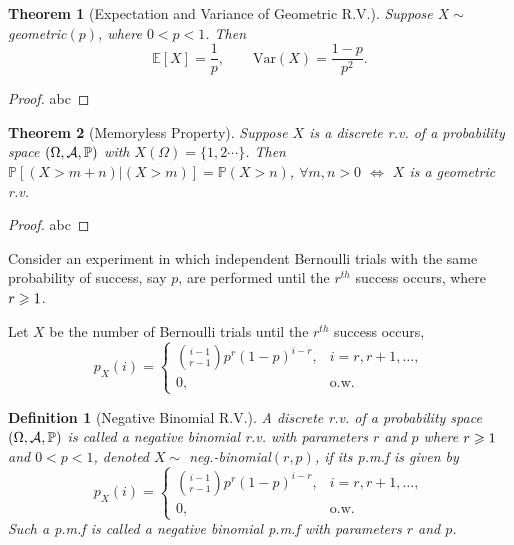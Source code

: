 \documentclass[openany,12pt]{book}
\newtheorem{theorem}{Theorem}[chapter]
\newtheorem{definition}{Definition}[chapter]
\begin{document}
\begin{theorem}[Expectation and Variance of Geometric R.V.]
  Suppose $X\sim$ geometric$(p)$, where $0<p<1$.
  Then
  $$
    \mathbb{E}[X]=\frac{1}{p},\qquad
    \mathrm{Var}(X)=\frac{1-p}{p^2}.
  $$
\end{theorem}

\begin{proof}
  abc
\end{proof}

\begin{theorem}[Memoryless Property]
  Suppose $X$ is a discrete r.v. of a probability space $(\Omega,\mathcal{A},\mathbb{P})$ with $X(\Omega)=\{1,2\cdots\}$. Then $\mathbb{P}[(X>m+n)|(X>m)]=\mathbb{P}(X>n)$, $\forall m,n>0$ $\Leftrightarrow$ $X$ is a geometric r.v.
\end{theorem}

\begin{proof}
  abc
\end{proof}

Consider an experiment in which independent Bernoulli trials with the same
probability of success, say $p$, are performed until the $r^{th}$ success occurs, where $r\geqslant1$.

Let $X$ be the number of Bernoulli trials until the  $r^{th}$ success occurs,
$$
  p_X(i)=
  \begin{cases}
    \binom {i-1} {r-1} p^r(1-p)^{i-r},   &i=r,r+1,\dots, \\
    0, &\text{o.w.}
  \end{cases}
$$

\begin{definition}[Negative Binomial R.V.]
  A discrete r.v. of a probability space $(\Omega,\mathcal{A},\mathbb{P})$ is called a negative binomial r.v. with parameters $r$ and $p$ where $r\geqslant1$ and $0<p<1$, denoted $X\sim$ neg.-binomial$(r,p)$, if its p.m.f is given by
  $$
    p_X(i)=
    \begin{cases}
      \binom {i-1} {r-1} p^r(1-p)^{i-r},   &i=r,r+1,\dots, \\
      0, &\text{o.w.}
    \end{cases}
  $$
  Such a p.m.f is called a negative binomial p.m.f with parameters $r$ and $p$.
\end{definition}
\end{document}
